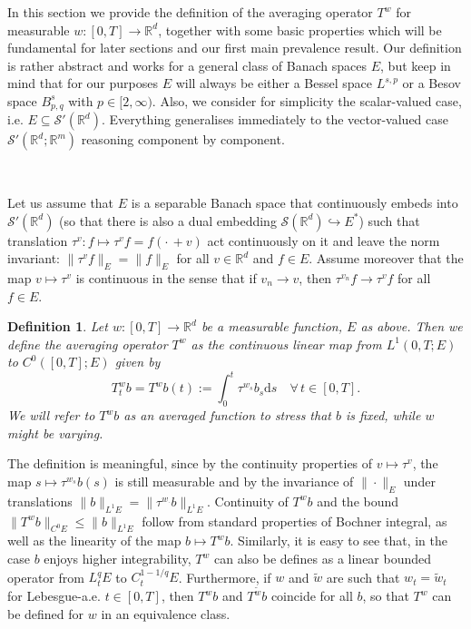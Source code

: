 \documentclass[10pt]{article}
\newcommand{\assign}{:=}
\newcommand{\mathd}{\mathrm{d}}
\newtheorem{definition}{Definition}
\begin{document}
In this section we provide the definition of the averaging operator $T^w$ for
measurable $w : [0, T] \rightarrow \mathbb{R}^d$, together with some basic
properties which will be fundamental for later sections and our first main
prevalence result. Our definition is rather abstract and works for a general
class of Banach spaces $E$, but keep in mind that for our purposes $E$ will
always be either a Bessel space $L^{s, p}$ or a Besov space $B^s_{p, q}$ with
$p \in [2, \infty)$. Also, we consider for simplicity the scalar-valued case,
i.e. $E \subseteq \mathcal{S}' (\mathbb{R}^d)$. Everything generalises
immediately to the vector-valued case $\mathcal{S}' (\mathbb{R}^d ;
\mathbb{R}^m)$ reasoning component by component.

\

Let us assume that $E$ is a separable Banach space that continuously embeds
into $\mathcal{S}' (\mathbb{R}^d)$ (so that there is also a dual embedding
$\mathcal{S} (\mathbb{R}^d) \hookrightarrow E^{\ast}$) such that translation
$\tau^v : f \mapsto \tau^v f = f \left( \cdot \, + v \right)$ act continuously
on it and leave the norm invariant: $\| \tau^v f \|_E = \| f \|_E$ for all $v
\in \mathbb{R}^d$ and $f \in E$. Assume moreover that the map $v \mapsto
\tau^v$ is continuous in the sense that if $v_n \rightarrow v$, then
$\tau^{v_n} f \rightarrow \tau^v f$ for all $f \in E$.

\begin{definition}
  \label{sec3.1 definition averaging}Let $w : [0, T] \rightarrow \mathbb{R}^d$
  be a measurable function, $E$ as above. Then we define the averaging
  operator $T^w$ as the continuous linear map from $L^1 (0, T ; E)$ to $C^0
  ([0, T] ; E)$ given by
  \[ T^w_t b = T^w b (t) \assign \int_0^t \tau^{w_s} b_s \mathd s \quad
     \forall \, t \in [0, T] . \]
  We will refer to $T^w b$ as an averaged function to stress that $b$ is
  fixed, while $w$ might be varying.
\end{definition}

The definition is meaningful, since by the continuity properties of $v \mapsto
\tau^v$, the map $s \mapsto \tau^{w_s} b (s)$ is still measurable and by the
invariance of $\| \cdot \|_E$ under translations $\| b \|_{L^1 E} = \|
\tau^{w_{\cdot}} b \|_{L^1 E}$. Continuity of $T^w b$ and the bound $\| T^w b
\|_{C^0 E} \leqslant \| b \|_{L^1 E}$ follow from standard properties of
Bochner integral, as well as the linearity of the map $b \mapsto T^w b$.
Similarly, it is easy to see that, in the case $b$ enjoys higher
integrability, $T^w$ can also be defines as a linear bounded operator from
$L^q_t E$ to $C_t^{1 - 1 / q} E$. Furthermore, if $w$ and $\tilde{w}$ are such
that $w_t = \tilde{w}_t$ for Lebesgue-a.e. $t \in [0, T]$, then $T^w b$ and
$T^{\tilde{w}} b$ coincide for all $b$, so that $T^w$ can be defined for $w$
in an equivalence class.
\end{document}

